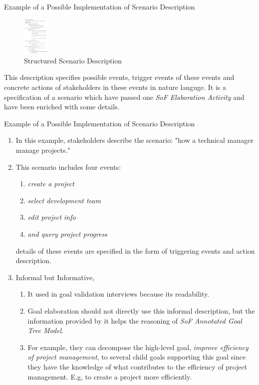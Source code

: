 \documentclass{beamer}
\begin{document}
\begin{frame}{Example of a Possible Implementation of Scenario Description}
  \begin{figure}
    \includegraphics[width=0.5in]{img/3.PNG}
    \caption{Structured Scenario Description}
  \end{figure}
    This description specifies possible events, trigger events of these events and concrete actions of stakeholders in these events in nature languge.
    It is a specification of a scenario which have passed one \emph{SoF Elaboration Activity} and have been enriched with some details.
\end{frame}

\begin{frame}{Example of a Possible Implementation of Scenario Description}
  \begin{enumerate}
  \item
    In this example, stakeholders describe the scenario: "how a technical manager manage projects."
  \item 
    This scenario includes four events:
    \begin{enumerate}
    \item \emph{create a project}
    \item \emph{select development team}
    \item \emph{edit project info}
    \item \emph{and query project progress}
    \end{enumerate}
    details of these events are specified in the form of triggering events and action description.
  \item Informal but Informative,
    \begin{enumerate}
    \item It used in goal validation interviews because its readability.
    \item Goal elaboration should not directly use this informal description, but the information provided by it helps the reasoning of \emph{SoF Annotated Goal Tree Model}.
    \item 
     For example, they can decompose the high-level goal, \emph{improve efficiency of project management}, to several child goals supporting this goal since they have the knowledge of what contributes to the efficiency of project management. E.g, to create a project more efficiently.
    \end{enumerate}
  \end{enumerate}
\end{frame}  
\end{document}
